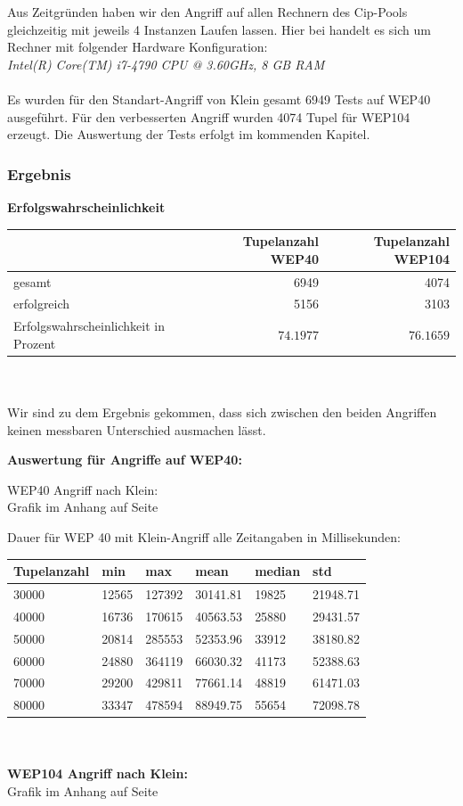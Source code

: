 \documentclass[10pt,a4paper]{article}
\begin{document}
Aus Zeitgründen haben wir den Angriff auf allen Rechnern des Cip-Pools gleichzeitig mit jeweils 4 Instanzen Laufen lassen.
Hier bei handelt es sich um Rechner mit folgender Hardware Konfiguration:
\\
\textit{Intel(R) Core(TM) i7-4790 CPU @ 3.60GHz, 8 GB RAM}
\\\\
Es wurden für den Standart-Angriff von Klein gesamt 6949 Tests auf WEP40 ausgeführt. Für den verbesserten Angriff wurden 4074 Tupel für WEP104 erzeugt. 
Die Auswertung der Tests erfolgt im kommenden Kapitel.
\subsubsection{Ergebnis}

\textbf{Erfolgswahrscheinlichkeit}



\begin{tabular}{|l|r|r|}
	\hline
	 & Tupelanzahl WEP40 & Tupelanzahl WEP104 \\
	\hline
	gesamt & 6949 & 4074 \\
	\hline
	erfolgreich & 5156 & 3103\\
	\hline
	Erfolgswahrscheinlichkeit in Prozent & $~74.1977$ & $~76.1659$\\
	\hline
\end{tabular}
\\\\
Wir sind zu dem Ergebnis gekommen, dass sich zwischen den beiden Angriffen keinen messbaren Unterschied ausmachen lässt.

\textbf{Auswertung für Angriffe auf WEP40:}

WEP40 Angriff nach Klein:\\

Grafik im Anhang auf Seite \pageref{fig:wep40_suc}


Dauer für WEP 40 mit Klein-Angriff alle Zeitangaben in Millisekunden:\\

\begin{tabular}{|l|l|l|l|l|l|}
	\hline
	Tupelanzahl & min      	& max 		& mean 		&   median 	&      std \\
	\hline
	30000 		& 12565		& 127392 	& 30141.81  &	19825 	& 21948.71 \\
	\hline
	40000 		& 16736 	& 170615 	& 40563.53  & 	25880	& 29431.57 \\
	\hline
	50000		& 20814 	& 285553 	& 52353.96 	& 	33912 	& 38180.82\\ 
	\hline
	60000 		& 24880		& 364119 	& 66030.32 	& 	41173 	& 52388.63\\ 
	\hline
	70000 		& 29200		& 429811	& 77661.14	&  	48819 	& 61471.03\\ 
	\hline
	80000 		& 33347 	& 478594	& 88949.75	&	55654	& 72098.78\\
	\hline
	
\end{tabular}
\\\\
\textbf{WEP104 Angriff nach Klein:}\\
Grafik im Anhang auf Seite \pageref{fig:wep100_suc}
\end{document}
